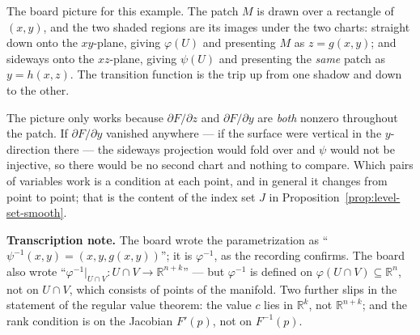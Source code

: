 \documentclass[11pt]{report}
\begin{document}
\begin{center}
\end{center}

The board picture for this example. The patch $M$ is drawn over a rectangle of $(x,y)$, and the two shaded regions are its images under the two charts: straight down onto the $xy$-plane, giving $\varphi(U)$ and presenting $M$ as $z = g(x,y)$; and sideways onto the $xz$-plane, giving $\psi(U)$ and presenting the \emph{same} patch as $y = h(x,z)$. The transition function is the trip up from one shadow and down to the other.

The picture only works because $\partial F/\partial z$ and $\partial F/\partial y$ are \emph{both} nonzero throughout the patch. If $\partial F/\partial y$ vanished anywhere --- if the surface were vertical in the $y$-direction there --- the sideways projection would fold over and $\psi$ would not be injective, so there would be no second chart and nothing to compare. Which pairs of variables work is a condition at each point, and in general it changes from point to point; that is the content of the index set $J$ in Proposition~\ref{prop:level-set-smooth}.

\textbf{Transcription note.} The board wrote the parametrization as ``$\psi^{-1}(x,y) = (x,y,g(x,y))$''; it is $\varphi^{-1}$, as the recording confirms. The board also wrote ``$\varphi^{-1}|_{U \cap V} : U \cap V \to \mathbb{R}^{n+k}$'' --- but $\varphi^{-1}$ is defined on $\varphi(U \cap V) \subseteq \mathbb{R}^n$, not on $U \cap V$, which consists of points of the manifold. Two further slips in the statement of the regular value theorem: the value $c$ lies in $\mathbb{R}^k$, not $\mathbb{R}^{n+k}$; and the rank condition is on the Jacobian $F'(p)$, not on $F^{-1}(p)$.
\end{document}
